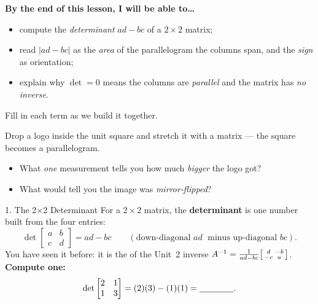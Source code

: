 \documentclass[10pt]{article}
\begin{document}
\namedateperiod

\vspace{0.12in}

\begin{objectivebox}
\textbf{By the end of this lesson, I will be able to\dots}
\begin{itemize}\setlength{\itemsep}{2pt}
  \item compute the \emph{determinant} $ad-bc$ of a $2\times2$ matrix;
  \item read $|ad-bc|$ as the \emph{area} of the parallelogram the columns span, and the \emph{sign} as orientation;
  \item explain why $\det=0$ means the columns are \emph{parallel} and the matrix has \emph{no inverse}.
\end{itemize}
\end{objectivebox}

\vspace{0.08in}

\begin{vocabbox}
\small
Fill in each term as we build it together.
\vspace{2pt}
\end{vocabbox}

\begin{hookbox}
Drop a logo inside the unit square and stretch it with a matrix --- the square becomes a
parallelogram.
\begin{itemize}\setlength{\itemsep}{1pt}
  \item What \emph{one} measurement tells you how much \emph{bigger} the logo got? \writeline
  \item What would tell you the image was \emph{mirror-flipped}? \writeline
\end{itemize}
\end{hookbox}

\begin{notesbox}{1. The 2$\times$2 Determinant}
For a $2\times2$ matrix, the \textbf{determinant} is one number built from the four entries:
\[
  \det\begin{bmatrix} a & b \\ c & d \end{bmatrix} = ad - bc
  \qquad(\text{down-diagonal } ad \;\text{ minus up-diagonal } bc).
\]
You have seen it before: it is the \blank{3.4cm} of the Unit~2 inverse
$A^{-1}=\frac{1}{ad-bc}\begin{bsmallmatrix} d & -b\\ -c & a \end{bsmallmatrix}$. \textbf{Compute one:}
\[
  \det\begin{bmatrix} 2 & 1 \\ 1 & 3 \end{bmatrix}
  = (2)(3) - (1)(1) = \blank{1.4cm}.
\]
\end{notesbox}
\end{document}
